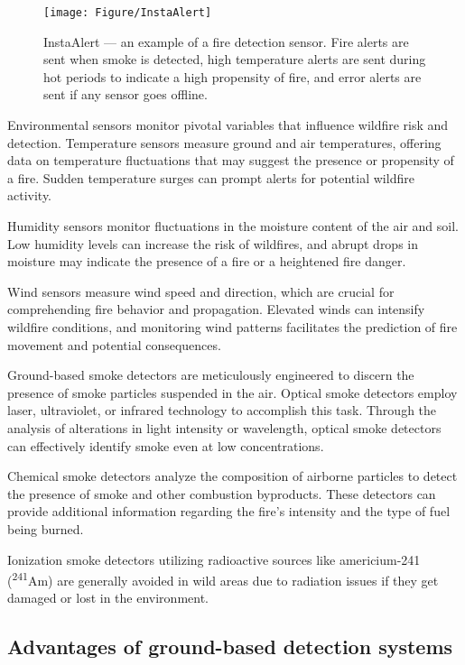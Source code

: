 \documentclass[
  12 pt,
]{Nemilov}
\begin{document}
\begin{figure}

{\centering \texttt{[image: Figure/InstaAlert]} 

}

\caption[InstaAlert --- an example of a fire detection sensor.]{InstaAlert --- an example of a fire detection sensor. Fire alerts are sent when smoke is detected, high temperature alerts are sent during hot periods to indicate a high propensity of fire, and error alerts are sent if any sensor goes offline.}\label{fig:InstaAlert}
\end{figure}

Environmental sensors monitor pivotal variables that influence wildfire risk and detection. Temperature sensors measure ground and air temperatures, offering data on temperature fluctuations that may suggest the presence or propensity of a fire. Sudden temperature surges can prompt alerts for potential wildfire activity.

Humidity sensors monitor fluctuations in the moisture content of the air and soil. Low humidity levels can increase the risk of wildfires, and abrupt drops in moisture may indicate the presence of a fire or a heightened fire danger.

Wind sensors measure wind speed and direction, which are crucial for comprehending fire behavior and propagation. Elevated winds can intensify wildfire conditions, and monitoring wind patterns facilitates the prediction of fire movement and potential consequences.

Ground-based smoke detectors are meticulously engineered to discern the presence of smoke particles suspended in the air. Optical smoke detectors employ laser, ultraviolet, or infrared technology to accomplish this task. Through the analysis of alterations in light intensity or wavelength, optical smoke detectors can effectively identify smoke even at low concentrations.

Chemical smoke detectors analyze the composition of airborne particles to detect the presence of smoke and other combustion byproducts. These detectors can provide additional information regarding the fire's intensity and the type of fuel being burned.

Ionization smoke detectors utilizing radioactive sources like americium-241 (\textsuperscript{241}Am) are generally avoided in wild areas due to radiation issues if they get damaged or lost in the environment.

\subsection{Advantages of ground-based detection systems}\label{advantages-of-ground-based-detection-systems}
\end{document}
